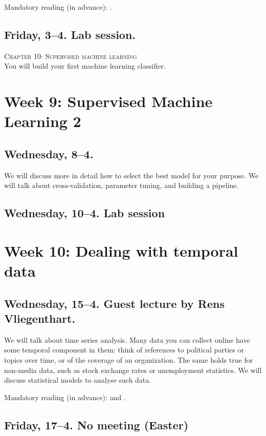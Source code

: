 Mandatory reading (in advance): \cite{burscher2014}. 

\subsection*{Friday, 3--4. Lab session.}
\textsc{ Chapter 10: Supervised machine learning}\\
You will build your first machine learning classifier.



\section*{Week 9: Supervised Machine Learning 2}

\subsection*{Wednesday, 8--4.}
We will discuss more in detail how to select the best model for your purpose. We will talk about cross-validation, parameter tuning, and building a pipeline.

\subsection*{Wednesday, 10--4. Lab session}



\section*{Week 10: Dealing with temporal data}

\subsection*{Wednesday, 15--4. Guest lecture by Rens Vliegenthart.}
We will talk about time series analysis. Many data you can collect online have some temporal component in them: think of references to political parties or topics over time, or of the coverage of an organization. The same holds true for non-media data, such as stock exchange rates or unemployment statistics. We will discuss statistical models to analyse such data.


Mandatory reading (in advance): \cite{Vliegenthart2014} and \cite{Strycharz2018}.


\subsection*{Friday, 17--4. No meeting (Easter)}




